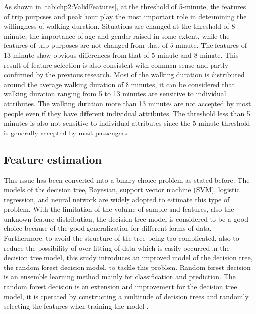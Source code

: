 As shown in \ref{tab:chp2:ValidFeatures}, at the threshold of 5-minute, the features of trip purposes and peak hour play the most important role in determining the willingness of walking duration. Situations are changed at the threshold of 8-minute, the importance of age and gender raised in some extent, while the features of trip purposes are not changed from that of 5-minute. The features of 13-minute show obvious differences from that of 5-minute and 8-minute. This result of feature selection is also consistent with common sense and partly confirmed by the previous research. Most of the walking duration is distributed around the average walking duration of 8 minutes, it can be considered that walking duration ranging from 5 to 13 minutes are sensitive to individual attributes. The walking duration more than 13 minutes are not accepted by most people even if they have different individual attributes. The threshold less than 5 minutes is also not sensitive to individual attributes since the 5-minute threshold is generally accepted by most passengers.

%
\subsection{Feature estimation}

This issue has been converted into a binary choice problem as stated before. The models of the decision tree, Bayesian, support vector machine (SVM), logistic regression, and neural network are widely adopted to estimate this type of problem. With the limitation of the volume of sample and features, also the unknown feature distribution, the decision tree model is considered to be a good choice because of the good generalization for different forms of data. Furthermore, to avoid the structure of the tree being too complicated, also to reduce the possibility of over-fitting of data which is easily occurred in the decision tree model, this study introduces an improved model of the decision tree, the random forest decision model, to tackle this problem. Random forest decision is an ensemble learning method mainly for classification and prediction. The random forest decision is an extension and improvement for the decision tree model, it is operated by constructing a multitude of decision trees and randomly selecting the features when training the model \cite{ho1995random,ho1998random}. 

